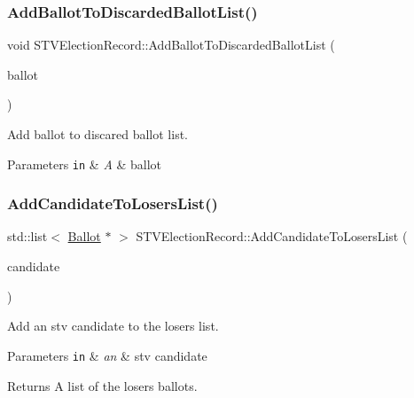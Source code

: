 \subsubsection{\texorpdfstring{Add\+Ballot\+To\+Discarded\+Ballot\+List()}{AddBallotToDiscardedBallotList()}}
{\footnotesize\ttfamily void S\+T\+V\+Election\+Record\+::\+Add\+Ballot\+To\+Discarded\+Ballot\+List (\begin{DoxyParamCaption}\item[{\hyperlink{classBallot}{Ballot} $\ast$}]{ballot }\end{DoxyParamCaption})}



Add ballot to discared ballot list. 


\begin{DoxyParams}[1]{Parameters}
\mbox{\tt in}  & {\em A} & ballot \\
\hline
\end{DoxyParams}
\mbox{\label{classSTVElectionRecord_a5909386b596e6563a2ec332921133ab6}} 
\subsubsection{\texorpdfstring{Add\+Candidate\+To\+Losers\+List()}{AddCandidateToLosersList()}}
{\footnotesize\ttfamily std\+::list$<$ \hyperlink{classBallot}{Ballot} $\ast$ $>$ S\+T\+V\+Election\+Record\+::\+Add\+Candidate\+To\+Losers\+List (\begin{DoxyParamCaption}\item[{\hyperlink{classSTVCandidate}{S\+T\+V\+Candidate} $\ast$}]{candidate }\end{DoxyParamCaption})}



Add an stv candidate to the losers list. 


\begin{DoxyParams}[1]{Parameters}
\mbox{\tt in}  & {\em an} & stv candidate\\
\hline
\end{DoxyParams}
\begin{DoxyReturn}{Returns}
A list of the losers ballots. 
\end{DoxyReturn}
\mbox{\label{classSTVElectionRecord_af466fd6edc790d7744fe809e7ee9d40c}} 
